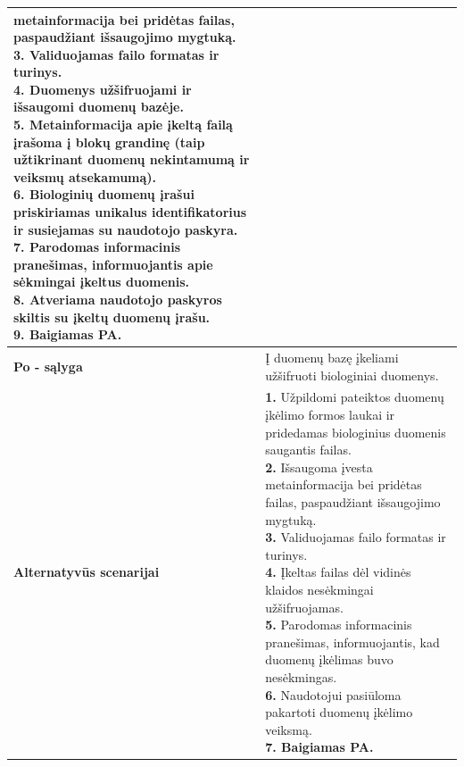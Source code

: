 \documentclass[12pt]{article}
\begin{document}
\begin{table}[htb!]
\begin{tabular}{|m{3cm}|m{13.7cm}|}
{{{            metainformacija bei pridėtas failas, paspaudžiant išsaugojimo
            mygtuką.} \\
            \textbf{3.} {Validuojamas failo formatas ir turinys.} \\
            \textbf{4.} {Duomenys užšifruojami ir išsaugomi duomenų bazėje.} \\
            \textbf{5.} {Metainformacija apie įkeltą failą įrašoma į blokų
            grandinę (taip užtikrinant duomenų nekintamumą ir veiksmų
            atsekamumą).} \\
            \textbf{6.} {Biologinių duomenų įrašui priskiriamas unikalus
            identifikatorius ir susiejamas su naudotojo paskyra.} \\
            \textbf{7.} {Parodomas informacinis pranešimas, informuojantis apie
            sėkmingai įkeltus duomenis.} \\
            \textbf{8.} \textcolor{dartmouthgreen}{Atveriama naudotojo paskyros
            skiltis su įkeltų duomenų įrašu.} \\
            \textbf{9. Baigiamas PA.}
        }}
        \\
        \hline
        \raggedleft \textbf{\cellcolor{deepchampagne}Po - sąlyga} &
        Į duomenų bazę įkeliami užšifruoti biologiniai duomenys. \\
        \hline
        \raggedleft \textbf{\cellcolor{deepchampagne}Alternatyvūs scenarijai} &
        \vskip 5pt
        \makecell[l]{\parbox[t]{13.7cm}{
            \textbf{1.} \textcolor{dartmouthgreen}{Užpildomi pateiktos
            duomenų įkėlimo formos laukai ir pridedamas biologinius duomenis
            saugantis failas.} \\
            \textbf{2.} \textcolor{dartmouthgreen}{Išsaugoma įvesta
            metainformacija bei pridėtas failas, paspaudžiant išsaugojimo
            mygtuką.} \\
            \textbf{3.} {Validuojamas failo formatas ir turinys.} \\
            \textbf{4.} {Įkeltas failas dėl vidinės klaidos nesėkmingai
            užšifruojamas.} \\
            \textbf{5.} {Parodomas informacinis pranešimas, informuojantis, kad
            duomenų įkėlimas buvo nesėkmingas.} \\
            \textbf{6.} {Naudotojui pasiūloma pakartoti duomenų įkėlimo
            veiksmą.} \\
            \textbf{7. Baigiamas PA.}
        }}
        \\
        \hline
    \end{tabular}
\end{table}
\end{document}
